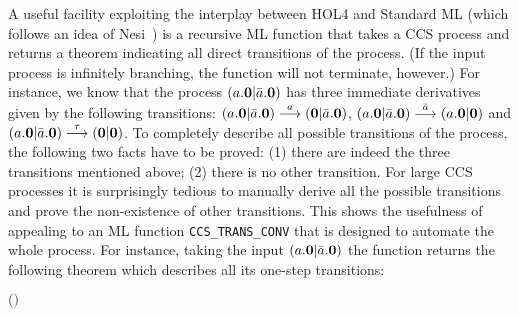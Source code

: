 A useful facility exploiting the interplay
between HOL4 and Standard ML (which follows an idea of Nesi~\cite{Nesi:1992ve})
 is a recursive ML function that takes a CCS process and returns a theorem indicating all
  direct transitions of the process. (If the input process is
 infinitely branching, the function will not terminate, however.)
For instance, we know that the process $(a.{\boldsymbol 0} | \bar{a}.{\boldsymbol 0})$ has three
immediate derivatives given by the following transitions:
$(a.{\boldsymbol 0} | \bar{a}.{\boldsymbol 0}) \overset{a}{\longrightarrow}
({\boldsymbol 0} | \bar{a}.{\boldsymbol 0})$, $(a.{\boldsymbol 0} | \bar{a}.{\boldsymbol 0})
\overset{\bar{a}}{\longrightarrow} (a.{\boldsymbol 0} | {\boldsymbol 0})$ and $(a.{\boldsymbol 0} | \bar{a}.{\boldsymbol 0})
\overset{\tau}{\longrightarrow} ({\boldsymbol 0} | {\boldsymbol 0})$.
To completely describe all possible transitions of the process, the
following two facts have to be proved: (1) there are indeed the three
  transitions mentioned above; (2) there is no other
  transition. For large CCS processes it is surprisingly tedious to manually derive
all the possible transitions and prove the non-existence of other transitions.
This shows the usefulness of appealing to an ML function
\texttt{CCS\_TRANS\_CONV} that is designed to automate the whole process.
For instance, taking the input $(a.{\boldsymbol 0} | \bar{a}.{\boldsymbol 0})$ the function returns the
following theorem which describes all its one-step transitions:
\begin{alltt}
\HOLTokenTurnstile{} \HOLConst{\HOLTokenInputAct} \HOLSymConst{\ensuremath{\ldotp}} \HOLSymConst{\ensuremath{\mid}} \HOLConst{\HOLTokenOutputAct} \HOLSymConst{\ensuremath{\ldotp}} \HOLTokenTransBegin{}\HOLTokenTransEnd {} \HOLSymConst{\HOLTokenEquiv{}}
   \ensuremath{(} \HOLSymConst{\ensuremath{=}} \HOLConst{\HOLTokenInputAct}  \HOLSymConst{\HOLTokenConj{}}  \HOLSymConst{\ensuremath{=}}  \HOLSymConst{\ensuremath{\mid}} \HOLConst{\HOLTokenOutputAct} \HOLSymConst{\ensuremath{\ldotp}} \HOLSymConst{\HOLTokenDisj{}}  \HOLSymConst{\ensuremath{=}} \HOLConst{\HOLTokenOutputAct}  \HOLSymConst{\HOLTokenConj{}}  \HOLSymConst{\ensuremath{=}} \HOLConst{\HOLTokenInputAct} \HOLSymConst{\ensuremath{\ldotp}} \HOLSymConst{\ensuremath{\mid}} \ensuremath{)} \HOLSymConst{\HOLTokenDisj{}}
    \HOLSymConst{\ensuremath{=}} \HOLSymConst{\ensuremath{\tau}} \HOLSymConst{\HOLTokenConj{}}  \HOLSymConst{\ensuremath{=}}  \HOLSymConst{\ensuremath{\mid}} 
\end{alltt}

